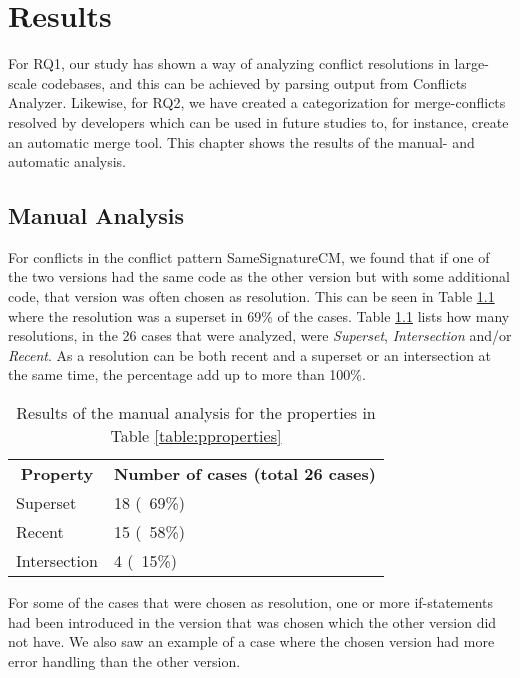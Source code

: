 \chapter{Results}
For RQ1, our study has shown a way of analyzing conflict resolutions in large-scale codebases, and this can be achieved by parsing output from Conflicts Analyzer. Likewise, for RQ2, we have created a categorization for merge-conflicts resolved by developers which can be used in future studies to, for instance, create an automatic merge tool. This chapter shows the results of the manual- and automatic analysis.
\section{Manual Analysis}
For conflicts in the conflict pattern SameSignatureCM, we found that if one of the two versions had the same code as the other version but with some additional code, that version was often chosen as resolution. This can be seen in Table \ref{table:rcsitma} where the resolution was a superset in 69\% of the cases. Table \ref{table:rcsitma} lists how many resolutions, in the 26 cases that were analyzed, were \textit{Superset}, \textit{Intersection} and/or \textit{Recent}. As a resolution can be both recent and a superset or an intersection at the same time, the percentage add up to more than 100\%.
\begin{table}
\caption{Results of the manual analysis for the properties in Table \ref{table:pproperties}}\label{table:rcsitma}
\begin{tabular}{ p{6cm} p{6cm} }
\hline
\multicolumn{1}{c}{\textbf{Property}} & \multicolumn{1}{c}{\textbf{Number of cases (total 26 cases)}}\\
Superset & 18 (~69\%)\\
Recent & 15 (~58\%)\\
Intersection & 4 (~15\%)\\
\end{tabular}
\end{table}
\FloatBarrier
For some of the cases that were chosen as resolution, one or more if-statements had been introduced in the version that was chosen which the other version did not have. We also saw an example of a case where the chosen version had more error handling than the other version.

